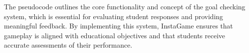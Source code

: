 The pseudocode outlines the core functionality and concept of the goal checking system, which is essential for evaluating student responses and providing meaningful feedback. By implementing this system, InstaGame ensures that gameplay is aligned with educational objectives and that students receive accurate assessments of their performance.